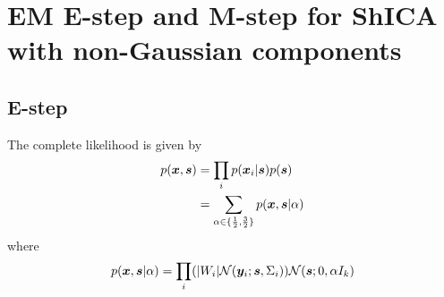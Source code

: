 \section{EM E-step and M-step for ShICA with non-Gaussian components}
\label{app:emestep}

  \subsection{E-step}
  The complete likelihood is given by
\begin{align}
  p(\boldsymbol{x}, \boldsymbol{s}) &= \prod_i p(\boldsymbol{x}_i | \boldsymbol{s}) p(\boldsymbol{s}) \\
  &=  \sum_{\alpha \in \{\frac12, \frac32\}} p(\boldsymbol{x}, \boldsymbol{s} | \alpha) 
\end{align}
where 
\[
p(\boldsymbol{x}, \boldsymbol{s} | \alpha)  = \prod_i (|W_i| \mathcal{N}(\boldsymbol{y}_i; \boldsymbol{s}, \Sigma_i)) \mathcal{N}(\boldsymbol{s}; 0, \alpha I_k)
\]

